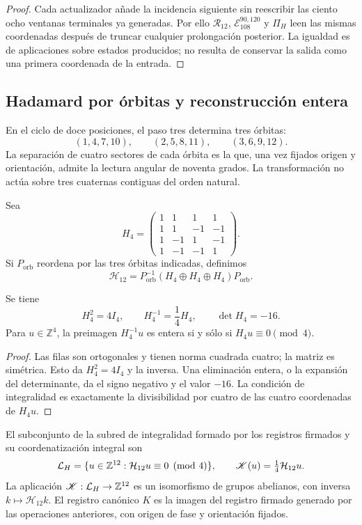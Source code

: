 \begin{proof}
Cada actualizador añade la incidencia siguiente sin reescribir las ciento
ocho ventanas terminales ya generadas. Por ello
\(\mathcal R_{12}\), \(\mathcal E_{108}^{90,120}\) y \(\Pi_H\) leen las
mismas coordenadas después de truncar cualquier prolongación posterior. La
igualdad es de aplicaciones sobre estados producidos; no resulta de conservar
la salida como una primera coordenada de la entrada.
\end{proof}

\subsection{Hadamard por órbitas y reconstrucción entera}
\label{subsec:k-hadamard}

En el ciclo de doce posiciones, el paso tres determina tres órbitas:
\[
 (1,4,7,10),\qquad(2,5,8,11),\qquad(3,6,9,12).
\]
La separación de cuatro sectores de cada órbita es la que, una vez fijados
origen y orientación, admite la lectura angular de noventa grados. La
transformación no actúa sobre tres cuaternas contiguas del orden natural.

Sea
\[
 H_4=\begin{pmatrix}
 1&1&1&1\\1&1&-1&-1\\1&-1&1&-1\\1&-1&-1&1
 \end{pmatrix}.
\]
Si \(P_{\mathrm{orb}}\) reordena por las tres órbitas indicadas,
definimos
\[
 \mathcal H_{12}=P_{\mathrm{orb}}^{-1}
 (H_4\oplus H_4\oplus H_4)P_{\mathrm{orb}}.
\]

\begin{lemma}
\label{lem:k-hadamard}
Se tiene
\[
 H_4^2=4I_4,\qquad H_4^{-1}=\frac14H_4,\qquad\det H_4=-16.
\]
Para \(u\in\mathbb Z^4\), la preimagen \(H_4^{-1}u\) es entera si y
sólo si \(H_4u\equiv0\pmod4\).
\end{lemma}

\begin{proof}
Las filas son ortogonales y tienen norma cuadrada cuatro; la matriz es
simétrica. Esto da \(H_4^2=4I_4\) y la inversa. Una eliminación entera,
o la expansión del determinante, da el signo negativo y el valor \(-16\).
La condición de integralidad es exactamente la divisibilidad por cuatro
de las cuatro coordenadas de \(H_4u\).
\end{proof}

\begin{definition}
El subconjunto de la subred de integralidad formado por los registros firmados y su coordenatización integral son
\[
 \mathcal L_H=\{u\in\mathbb Z^{12}:\mathcal H_{12}u\equiv0\pmod4\},
 \qquad \mathscr K(u)=\tfrac14\mathcal H_{12}u.
\]
La aplicación \(\mathscr K:\mathcal L_H\to\mathbb Z^{12}\) es un isomorfismo
de grupos abelianos, con inversa \(k\mapsto\mathcal H_{12}k\).
El registro canónico \(K\) es la imagen del registro firmado generado
por las operaciones anteriores, con origen de fase y orientación fijados.
\end{definition}

